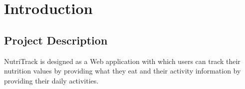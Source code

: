 \section{Introduction}
\subsection{Project Description}
\par NutriTrack is designed as a Web application with which users
can track their nutrition values by providing what they eat and
their activity information by providing their daily activities.
